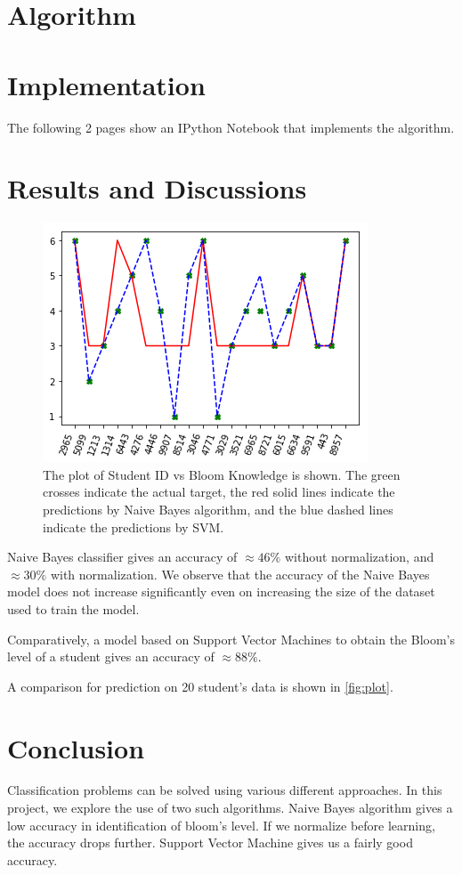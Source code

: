 \documentclass[12pt,oneside,a4paper]{article}
\begin{document}
		\section{Algorithm}
		
		\section{Implementation}
			The following 2 pages show an IPython Notebook that implements the algorithm.
			
		
		\section{Results and Discussions}
		
		\begin{figure}
			\centering
			\includegraphics[scale=0.7]{BloomLevelPredictor.png}
			\caption{\small{The plot of Student ID vs Bloom Knowledge is shown. The green crosses indicate the actual target, the red solid lines indicate the predictions by Naive Bayes algorithm, and the blue dashed lines indicate the predictions by SVM.}}
			\label{fig:plot}
		\end{figure}
		
		Naive Bayes classifier gives an accuracy of $\approx 46\%$ without normalization, and $\approx 30\%$ with normalization. We observe that the accuracy of the Naive Bayes model does not increase significantly even on increasing the size of the dataset used to train the model.

		Comparatively, a model based on Support Vector Machines to obtain the Bloom’s level of a student gives an accuracy of $\approx 88\%$.
		
		A comparison for prediction on 20 student's data is shown in \autoref{fig:plot}.

		\section{Conclusion}
			Classification problems can be solved using various different approaches. In this project, we explore the use of two such algorithms. Naive Bayes algorithm gives a low accuracy in identification of bloom’s level. If we normalize before learning, the accuracy drops further. Support Vector Machine gives us a fairly good accuracy.

	
	{}
\end{document}
